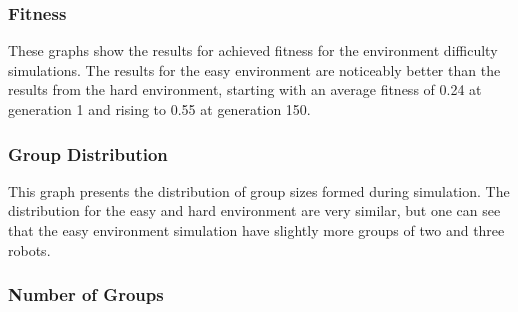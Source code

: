 \vspace*{\fill}

	\begin{center}
		\subsubsection{Fitness}
		\vspace*{-0.6cm}
	\end{center}


These graphs show the results for achieved fitness for the environment difficulty simulations.
The results for the easy environment are noticeably better than the results from the hard environment, starting with an average fitness of 0.24 at generation 1 and rising to 0.55 at generation 150. 

\vspace*{\fill}

\newpage
\vspace*{\fill}
\begin{center}
	\subsubsection{Group Distribution}
	\vspace*{-0.6cm}
	

\end{center}


	This graph presents the distribution of group sizes formed during simulation. The distribution for the easy and hard environment are very similar, but one can see that the easy environment simulation have slightly more groups of two and three robots.
	
\vspace*{\fill}
\newpage
\vspace*{\fill}
\begin{center}
	\subsubsection{Number of Groups}
\end{center}

